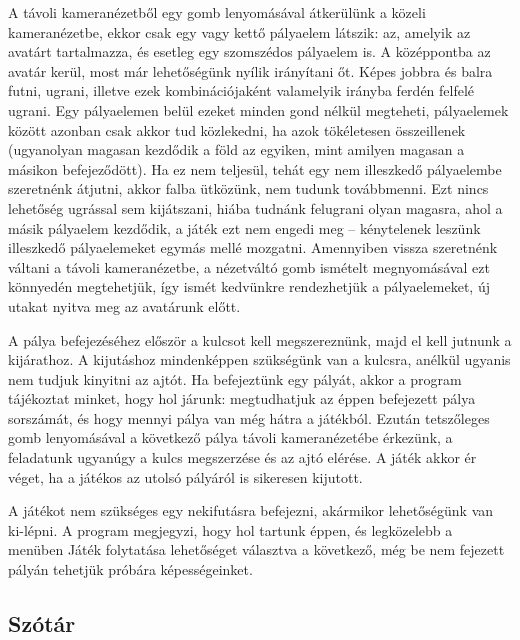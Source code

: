 A távoli kameranézetből egy gomb lenyomásával átkerülünk a közeli kameranézetbe, ekkor csak egy vagy kettő pályaelem látszik: az, amelyik az avatárt tartalmazza, és esetleg egy szomszédos pályaelem is. A középpontba az avatár kerül, most már lehetőségünk nyílik irányítani őt. Képes jobbra és balra futni, ugrani, illetve ezek kombinációjaként valamelyik irányba ferdén felfelé ugrani. Egy pályaelemen belül ezeket minden gond nélkül megteheti, pályaelemek között azonban csak akkor tud közlekedni, ha azok tökéletesen összeillenek (ugyanolyan magasan kezdődik a föld az egyiken, mint amilyen magasan a másikon befejeződött). Ha ez nem teljesül, tehát egy nem illeszkedő pályaelembe szeretnénk átjutni, akkor falba ütközünk, nem tudunk továbbmenni. Ezt nincs lehetőség ugrással sem kijátszani, hiába tudnánk felugrani olyan magasra, ahol a másik pályaelem kezdődik, a játék ezt nem engedi meg – kénytelenek leszünk illeszkedő pályaelemeket egymás mellé mozgatni. Amennyiben vissza szeretnénk váltani a távoli kameranézetbe, a nézetváltó gomb ismételt megnyomásával ezt könnyedén megtehetjük, így ismét kedvünkre rendezhetjük a pályaelemeket, új utakat nyitva meg az avatárunk előtt.\medskip 

A pálya befejezéséhez először a kulcsot kell megszereznünk, majd el kell jutnunk a kijárathoz. A kijutáshoz mindenképpen szükségünk van a kulcsra, anélkül ugyanis nem tudjuk kinyitni az ajtót. Ha befejeztünk egy pályát, akkor a program tájékoztat minket, hogy hol járunk: megtudhatjuk az éppen befejezett pálya sorszámát, és hogy mennyi pálya van még hátra a játékból. Ezután tetszőleges gomb lenyomásával a következő pálya távoli kameranézetébe érkezünk, a feladatunk ugyanúgy a kulcs megszerzése és az ajtó elérése. A játék akkor ér véget, ha a játékos az utolsó pályáról is sikeresen kijutott.\medskip

A játékot nem szükséges egy nekifutásra befejezni, akármikor lehetőségünk van ki-lépni. A program megjegyzi, hogy hol tartunk éppen, és legközelebb a menüben Játék folytatása lehetőséget választva a következő, még be nem fejezett pályán tehetjük próbára képességeinket.

\subsection{Szótár}

